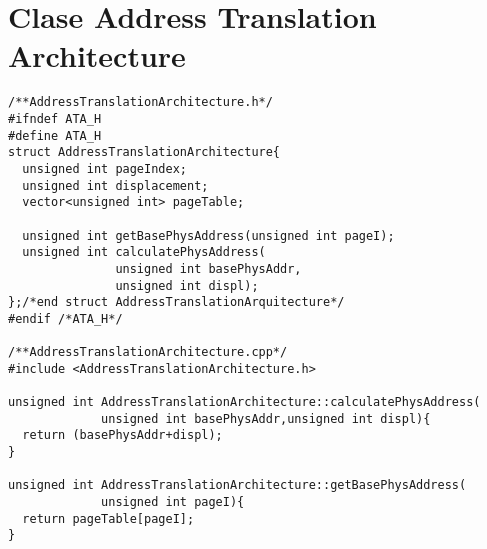 \documentclass{article}
\begin{document}
\section*{Clase Address Translation Architecture}
\begin{center}
\end{center}
\begin{verbatim}
/**AddressTranslationArchitecture.h*/
#ifndef ATA_H
#define ATA_H
struct AddressTranslationArchitecture{
  unsigned int pageIndex;
  unsigned int displacement;
  vector<unsigned int> pageTable;
  
  unsigned int getBasePhysAddress(unsigned int pageI);
  unsigned int calculatePhysAddress(
               unsigned int basePhysAddr,
               unsigned int displ);
};/*end struct AddressTranslationArquitecture*/
#endif /*ATA_H*/

/**AddressTranslationArchitecture.cpp*/
#include <AddressTranslationArchitecture.h>

unsigned int AddressTranslationArchitecture::calculatePhysAddress(
             unsigned int basePhysAddr,unsigned int displ){
  return (basePhysAddr+displ);                                  
}

unsigned int AddressTranslationArchitecture::getBasePhysAddress(
             unsigned int pageI){
  return pageTable[pageI];
}
\end{verbatim}
\end{document}
